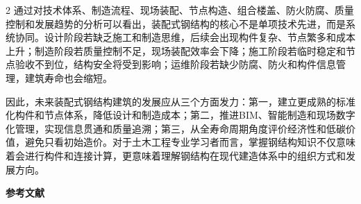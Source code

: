 ﻿\documentclass[UTF8,a4paper,10.5pt]{ctexart}
\newenvironment{bodytext}{\fontsize{10.5pt}{16pt}\selectfont\songti}{}
\begin{document}
\begin{bodytext}
\begin{multicols}{2}
通过对技术体系、制造流程、现场装配、节点构造、组合楼盖、防火防腐、质量控制和发展趋势的分析可以看出，装配式钢结构的核心不是单项技术先进，而是系统协同。设计阶段若缺乏施工和制造思维，后续会出现构件复杂、节点繁多和成本上升；制造阶段若质量控制不足，现场装配效率会下降；施工阶段若临时稳定和节点验收不到位，结构安全将受到影响；运维阶段若缺少防腐、防火和构件信息管理，建筑寿命也会缩短。

因此，未来装配式钢结构建筑的发展应从三个方面发力：第一，建立更成熟的标准化构件和节点体系，降低设计和制造成本；第二，推进BIM、智能制造和现场数字化管理，实现信息贯通和质量追溯；第三，从全寿命周期角度评价经济性和低碳价值，避免只看初始造价。对于土木工程专业学习者而言，掌握钢结构知识不仅意味着会进行构件和连接计算，更意味着理解钢结构在现代建造体系中的组织方式和发展方向。

\end{multicols}
\end{bodytext}

\vspace{0.5\baselineskip}
\begin{center}
{\songti\bfseries 参\quad 考\quad 文\quad 献}
\end{center}
\vspace{0.5\baselineskip}
\end{document}
